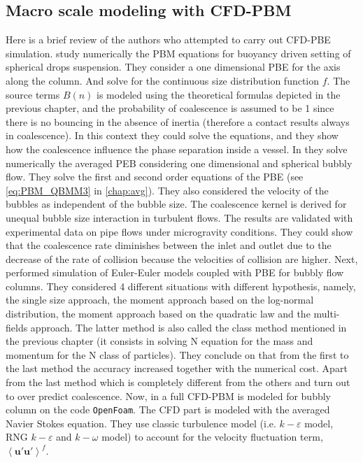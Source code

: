 \subsection{Macro scale modeling with CFD-PBM}
Here is a brief review of the authors who attempted to carry out CFD-PBE simulation.
\citet{wang1995simultaneous} study numerically the PBM equations for buoyancy driven setting of spherical drops suspension.
They consider a one dimensional PBE for the axis along the column. 
And solve for the continuous size distribution function $f$.
The source terms $B(n)$ is modeled using the theoretical formulas depicted in the previous chapter, and the probability of coalescence is assumed to be 1 since there is no bouncing in the absence of inertia (therefore a contact results always in coalescence). 
In this context they could  solve the equations, and they show how the coalescence influence the phase separation inside a vessel.
In \cite{KAMP20011363} they solve numerically the averaged PEB considering one dimensional and spherical bubbly flow.
They solve the first and second order equations of the PBE (see \ref{eq:PBM_QBMM3} in \ref{chap:avg}).
They also considered the velocity of the bubbles as independent of the bubble size. 
The coalescence kernel is derived for unequal bubble size interaction in turbulent flows. 
The results are validated with experimental data on pipe flows under microgravity conditions. 
They could show that the coalescence rate diminishes between the inlet and outlet due to the decrease of the rate of collision because the velocities of collision are  higher. 
Next,  \citet{morel2010comparison} performed simulation of Euler-Euler models coupled with PBE for bubbly flow columns. 
They considered 4 different situations with different hypothesis, namely, the single size approach, the moment approach based on the log-normal distribution, the moment approach based on the quadratic law and the multi-fields approach.
The latter method is also called the class method mentioned in the previous chapter (it consists in solving N equation for the mass and momentum for the N class of particles).
They conclude on that from the first to the last method the accuracy increased together with the numerical cost.
Apart from the last method which is completely different from the others and turn out to over predict coalescence. 
Now, in \citet{gemello2018modelling} a full CFD-PBM is modeled for bubbly column on the code \texttt{OpenFoam}. 
The CFD part is modeled with the averaged Navier Stokes equation.
They use classic turbulence model (i.e. $k-\varepsilon$ model, RNG $k-\varepsilon$ and $k-\omega$ model) to account for the velocity fluctuation term, $\left<\bm{u}'\bm{u}'\right>^f$. 
